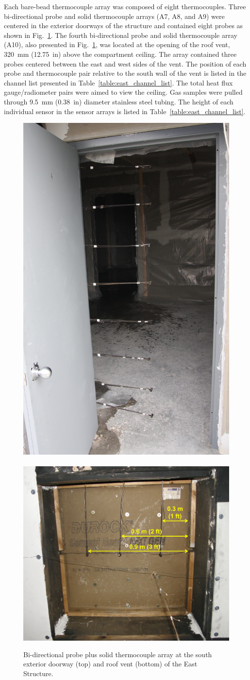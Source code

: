 \documentclass[12pt,oneside]{book}
\begin{document}
Each bare-bead thermocouple array was composed of eight thermocouples. Three bi-directional probe and solid thermocouple arrays (A7, A8, and A9) were centered in the exterior doorways of the structure and contained eight probes as shown in Fig.~\ref{fig:BDP_arrays}. The fourth bi-directional probe and solid thermocouple array (A10), also presented in Fig.~\ref{fig:BDP_arrays}, was located at the opening of the roof vent, 320~mm (12.75~in) above the compartment ceiling. The array contained three probes centered between the east and west sides of the vent. The position of each probe and thermocouple pair relative to the south wall of the vent is listed in the channel list presented in Table~\ref{table:east_channel_list}. The total heat flux gauge/radiometer pairs were aimed to view the ceiling. Gas samples were pulled through 9.5~mm (0.38~in) diameter stainless steel tubing. The height of each individual sensor in the sensor arrays is listed in Table~\ref{table:east_channel_list}.

\begin{figure}[!ht]
	\includegraphics[width=0.45\columnwidth]{../Figures/Pictures/doorway_BDPs}
	\\~\\
	\includegraphics[width=0.65\columnwidth]{../Figures/Pictures/roof_vent_BDPs}
	\caption[Bi-directional probe plus solid thermocouple arrays in East Structure.]{Bi-directional probe plus solid thermocouple array at the south exterior doorway (top) and roof vent (bottom) of the East Structure.}
	\label{fig:BDP_arrays}
\end{figure}
\end{document}
